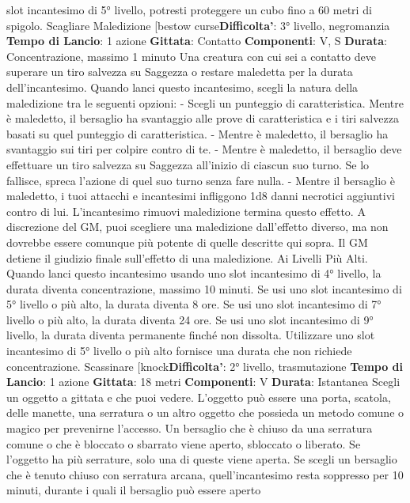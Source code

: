 \begin{multicols}{2}
slot incantesimo di 5° livello, potresti proteggere un
cubo fino a 60 metri di spigolo.
Scagliare Maledizione
[bestow curse\textbf{Difficolta'}:
3° livello, negromanzia
\textbf{Tempo di Lancio}: 1 azione
\textbf{Gittata}: Contatto
\textbf{Componenti}: V, S
\textbf{Durata}: Concentrazione, massimo 1 minuto
Una creatura con cui sei a contatto deve superare un
tiro salvezza su Saggezza o restare maledetta per la
durata dell’incantesimo. Quando lanci questo
incantesimo, scegli la natura della maledizione tra le
seguenti opzioni:
- Scegli un punteggio di caratteristica. Mentre è
maledetto, il bersaglio ha svantaggio alle prove di
caratteristica e i tiri salvezza basati su quel
punteggio di caratteristica.
- Mentre è maledetto, il bersaglio ha svantaggio sui
tiri per colpire contro di te.
- Mentre è maledetto, il bersaglio deve effettuare un
tiro salvezza su Saggezza all’inizio di ciascun suo
turno. Se lo fallisce, spreca l’azione di quel suo
turno senza fare nulla.
- Mentre il bersaglio è maledetto, i tuoi attacchi e
incantesimi infliggono 1d8 danni necrotici aggiuntivi
contro di lui.
L’incantesimo rimuovi maledizione termina questo
effetto. A discrezione del GM, puoi scegliere una
maledizione dall’effetto diverso, ma non dovrebbe
essere comunque più potente di quelle descritte qui
sopra. Il GM detiene il giudizio finale sull’effetto di una
maledizione.
Ai Livelli Più Alti. Quando lanci questo incantesimo
usando uno slot incantesimo di 4° livello, la durata
diventa concentrazione, massimo 10 minuti. Se usi uno
slot incantesimo di 5° livello o più alto, la durata diventa
8 ore. Se usi uno slot incantesimo di 7° livello o più alto,
la durata diventa 24 ore. Se usi uno slot incantesimo di
9° livello, la durata diventa permanente finché non
dissolta. Utilizzare uno slot incantesimo di 5° livello o
più alto fornisce una durata che non richiede
concentrazione.
Scassinare
[knock\textbf{Difficolta'}:
2° livello, trasmutazione
\textbf{Tempo di Lancio}: 1 azione
\textbf{Gittata}: 18 metri
\textbf{Componenti}: V
\textbf{Durata}: Istantanea
Scegli un oggetto a gittata e che puoi vedere. L’oggetto
può essere una porta, scatola, delle manette, una
serratura o un altro oggetto che possieda un metodo
comune o magico per prevenirne l’accesso.
Un bersaglio che è chiuso da una serratura comune o
che è bloccato o sbarrato viene aperto, sbloccato o
liberato. Se l’oggetto ha più serrature, solo una di
queste viene aperta.
Se scegli un bersaglio che è tenuto chiuso con
serratura arcana, quell’incantesimo resta soppresso per
10 minuti, durante i quali il bersaglio può essere aperto

\end{multicols}
